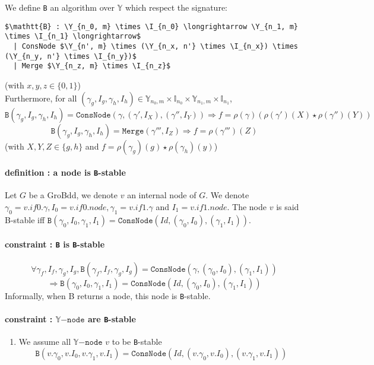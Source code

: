 \documentclass[a4paper,10pt]{article}
\newcommand{\Y}{\mathbb{Y}}%
\newcommand{\I}{\mathbb{I}}%
\newcommand{\Ynode}{\Y\mathtt{-node}}
\begin{document}
We define \texttt{B} an algorithm over $\Y$ which respect the signature:
\begin{lstlisting}
$\mathtt{B} : \Y_{n_0, m} \times \I_{n_0} \longrightarrow \Y_{n_1, m} \times \I_{n_1} \longrightarrow$
  | ConsNode $\Y_{n', m} \times (\Y_{n_x, n'} \times \I_{n_x}) \times (\Y_{n_y, n'} \times \I_{n_y})$
  | Merge $\Y_{n_z, m} \times \I_{n_z}$
\end{lstlisting}
(with $x, y, z \in \{0, 1\}$) \\
Furthermore, for all $(\gamma_g, I_g, \gamma_h, I_h) \in \Y_{n_0, m} \times \I_{n_0} \times \Y_{n_1, m} \times \I_{n_1}$, 
\[ \texttt{B}(\gamma_g, I_g, \gamma_h, I_h) = \texttt{ConsNode} (\gamma, (\gamma', I_X), (\gamma'', I_Y)) \Rightarrow f = \rho\left(\gamma\right) \left(\rho\left(\gamma'\right)(X) \star \rho\left(\gamma''\right)(Y)\right)\]
\[ \texttt{B}(\gamma_g, I_g, \gamma_h, I_h) = \texttt{Merge} (\gamma''', I_Z) \Rightarrow f = \rho(\gamma''')(Z) \]
(with $X, Y, Z \in\{g, h\}$ and $f = \rho(\gamma_g)(g) \star \rho(\gamma_h)(y)$)

\paragraph{definition : a node is \texttt{B}-stable\\}
Let $G$ be a GroBdd, we denote $v$ an internal node of $G$.
We denote $\gamma_0 = v.if0.\gamma, I_0 = v.if0.node, \gamma_1 = v.if1.\gamma$ and $I_1 = v.if1.node$.
The node $v$ is said B-stable iff $\mathtt{B}(\gamma_0, I_0, \gamma_1, I_1) = \mathtt{ConsNode}(Id, (\gamma_0, I_0), (\gamma_1, I_1))$.

\paragraph{constraint : \texttt{B} is \texttt{B}-stable\\}
\[\forall \gamma_f, I_f, \gamma_g, I_g, \mathtt{B}(\gamma_f, I_f, \gamma_g, I_g) = \mathtt{ConsNode}(\gamma, (\gamma_0, I_0), (\gamma_1, I_1))\]
\[\Rightarrow \mathtt{B}(\gamma_0, I_0, \gamma_1, I_1) = \mathtt{ConsNode}(Id, (\gamma_0, I_0), (\gamma_1, I_1))\]
Informally, when B returns a node, this node is \texttt{B}-stable.

\paragraph{constraint : $\Ynode$ are \texttt{B}-stable}
\begin{enumerate}
\item We assume all $\Ynode$ $v$ to be \texttt{B}-stable
\[\mathtt{B}(v.\gamma_0, v.I_0, v.\gamma_1, v.I_1) = \mathtt{ConsNode}(Id, (v.\gamma_0, v.I_0), (v.\gamma_1, v.I_1))\]
\end{enumerate}
\end{document}
